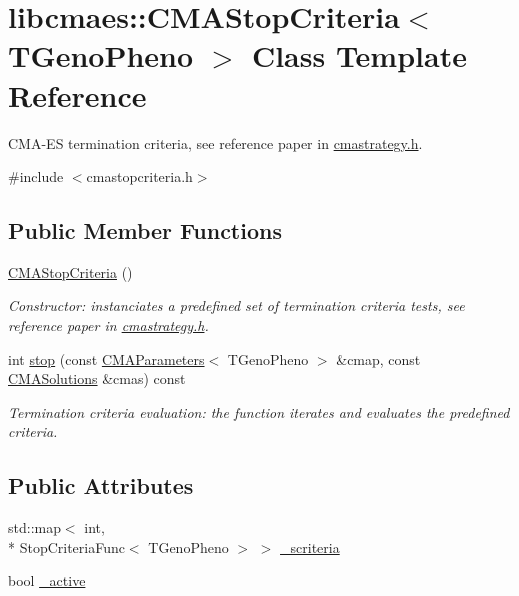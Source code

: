 \hypertarget{classlibcmaes_1_1CMAStopCriteria}{\section{libcmaes\-:\-:C\-M\-A\-Stop\-Criteria$<$ T\-Geno\-Pheno $>$ Class Template Reference}
\label{classlibcmaes_1_1CMAStopCriteria}
}


C\-M\-A-\/\-E\-S termination criteria, see reference paper in \hyperlink{cmastrategy_8h_source}{cmastrategy.\-h}.  




{\ttfamily \#include $<$cmastopcriteria.\-h$>$}

\subsection*{Public Member Functions}
\begin{DoxyCompactItemize}
\item 
\hypertarget{classlibcmaes_1_1CMAStopCriteria_a8b7795af41cba9122799e221d3b95b7b}{\hyperlink{classlibcmaes_1_1CMAStopCriteria_a8b7795af41cba9122799e221d3b95b7b}{C\-M\-A\-Stop\-Criteria} ()}\label{classlibcmaes_1_1CMAStopCriteria_a8b7795af41cba9122799e221d3b95b7b}

\begin{DoxyCompactList}\small\item\em Constructor\-: instanciates a predefined set of termination criteria tests, see reference paper in \hyperlink{cmastrategy_8h_source}{cmastrategy.\-h}. \end{DoxyCompactList}\item 
int \hyperlink{classlibcmaes_1_1CMAStopCriteria_a6049e6ee663be2aa8781e9bd3cf9cba8}{stop} (const \hyperlink{classlibcmaes_1_1CMAParameters}{C\-M\-A\-Parameters}$<$ T\-Geno\-Pheno $>$ \&cmap, const \hyperlink{classlibcmaes_1_1CMASolutions}{C\-M\-A\-Solutions} \&cmas) const 
\begin{DoxyCompactList}\small\item\em Termination criteria evaluation\-: the function iterates and evaluates the predefined criteria. \end{DoxyCompactList}\end{DoxyCompactItemize}
\subsection*{Public Attributes}
\begin{DoxyCompactItemize}
\item 
std\-::map$<$ int, \\*
Stop\-Criteria\-Func$<$ T\-Geno\-Pheno $>$ $>$ \hyperlink{classlibcmaes_1_1CMAStopCriteria_a28799c079f8bccfdbe0df124722dbfa2}{\-\_\-scriteria}
\item 
bool \hyperlink{classlibcmaes_1_1CMAStopCriteria_a09534d620cfe4c35c03d8a80205346ba}{\-\_\-active}
\end{DoxyCompactItemize}


